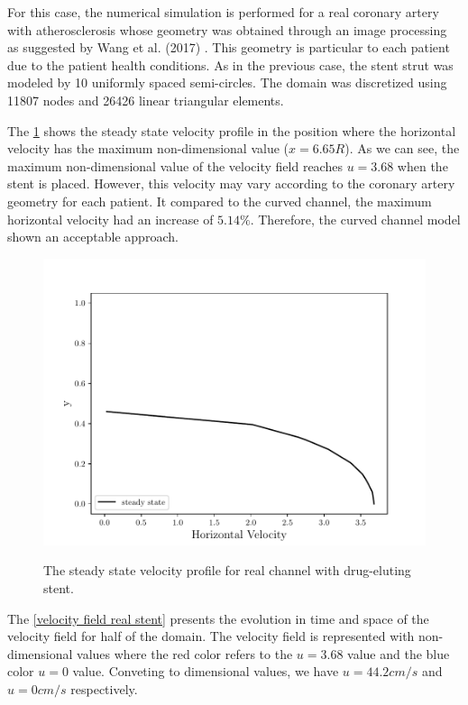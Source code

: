For this case, the numerical simulation is performed for a real 
coronary artery with atherosclerosis whose geometry was obtained 
through an image processing as suggested by Wang et al. (2017) 
\cite{wang2017}. This geometry is particular to each patient 
due to the patient health conditions. As in the previous case, 
the stent strut was modeled by
10 uniformly spaced semi-circles.
The domain was discretized using 11807 nodes and 26426 linear 
triangular elements. 

\medskip
The \ref{velocity evolution real stent} shows the steady state velocity 
profile in the position where the horizontal velocity 
has the maximum non-dimensional value ($x=6.65R$). 
As we can see, the maximum non-dimensional value of the velocity field 
reaches $u=3.68$ when the stent is placed. 
However, this velocity may vary according to the 
coronary artery geometry for each patient.
It compared to the curved channel, the maximum horizontal velocity
had an increase of $5.14\%$. Therefore, the curved channel model
shown an acceptable approach.


\begin{figure}[H]
     \centering
     \includegraphics[scale=1]{./02_chaps/cap_solution/figure/vel_RealStrut_evol.pdf}\\
     \caption{
The steady state velocity profile for real channel with drug-eluting stent.}
     \label{velocity evolution real stent}
\end{figure}

\medskip
The \ref{velocity field real stent} presents the evolution in 
time and space of the velocity field for half of the domain. 
The velocity field is represented with non-dimensional values 
where the red color refers to the $u=3.68$ value and the blue color 
$u=0$ value. Conveting to dimensional values, 
we have $u=44.2cm/s$ and $u=0cm/s$ respectively.


